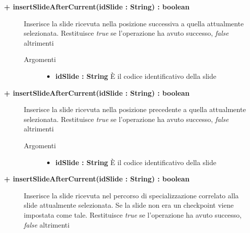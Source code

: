 \begin{description}
\begin{description}
	\end{description}
	
	\begin{description}
		\item[\textbf{\color{blue}+ insertSlideAfterCurrent(idSlide : String) : boolean			}] \hfill
			Inserisce la slide ricevuta nella posizione successiva a quella attualmente selezionata. Restituisce \textit{true} se l'operazione ha avuto successo, \textit{false} altrimenti
			
		\begin{description}
			\item[Argomenti] \hfill
				\begin{itemize}
				
					\item \textbf{idSlide : String	} \hfill
					È il codice identificativo della slide
					
				\end{itemize}
			
		\end{description}
			
	\end{description}
	
	\begin{description}
		\item[\textbf{\color{blue}+ insertSlideAfterCurrent(idSlide : String) : boolean			}] \hfill
			Inserisce la slide ricevuta nella posizione precedente a quella attualmente selezionata. Restituisce \textit{true} se l'operazione ha avuto successo, \textit{false} altrimenti
			
		\begin{description}
			\item[Argomenti] \hfill
				\begin{itemize}
				
					\item \textbf{idSlide : String	} \hfill
					È il codice identificativo della slide
					
				\end{itemize}
			
		\end{description}
			
	\end{description}
	
	\begin{description}
		\item[\textbf{\color{blue}+ insertSlideAfterCurrent(idSlide : String) : boolean			}] \hfill
			Inserisce la slide ricevuta nel percorso di specializzazione correlato alla slide attualmente selezionata. Se la slide non era un checkpoint viene impostata come tale. Restituisce \textit{true} se l'operazione ha avuto successo, \textit{false} altrimenti
			

\end{description}
\end{description}
